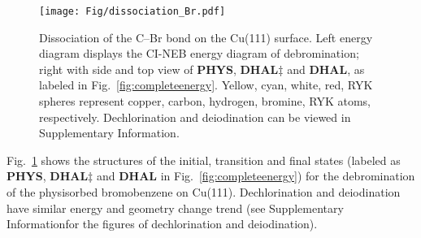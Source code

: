 \documentclass[%
 reprint,
 amsmath,amssymb,
 aps,
prb,
floatfix,
]{revtex4-2}
\newcommand{\lock}{\color{red}}
\newcommand{\lock}{\color{red}}
\newcommand{\sinfo}{Supplementary Information}
\begin{document}
\begin{figure}[hbt]
\centering
\texttt{[image: Fig/dissociation\_Br.pdf]}
\caption{Dissociation of the C--Br bond on the Cu(111) surface. Left energy diagram displays the CI-NEB energy diagram of debromination; right with side and top view of \textbf{PHYS}, \textbf{DHAL$\ddagger$} and \textbf{DHAL}, as labeled in Fig.~\ref{fig:completeenergy}. Yellow, cyan, white, red, RYK spheres represent copper, carbon, hydrogen, bromine, RYK atoms, respectively. Dechlorination and deiodination can be viewed in \sinfo.
}
\label{fig:dissociation_Br}
\end{figure}

{\lock

Fig.~\ref{fig:dissociation_Br} shows the structures of the initial, transition and final states (labeled as \textbf{PHYS}, \textbf{DHAL$\ddagger$} and \textbf{DHAL} in Fig.~\ref{fig:completeenergy}) for the debromination of the physisorbed bromobenzene on Cu(111). Dechlorination and deiodination have similar energy and geometry change trend (see \sinfo for the figures of dechlorination and deiodination).

}
\end{document}
